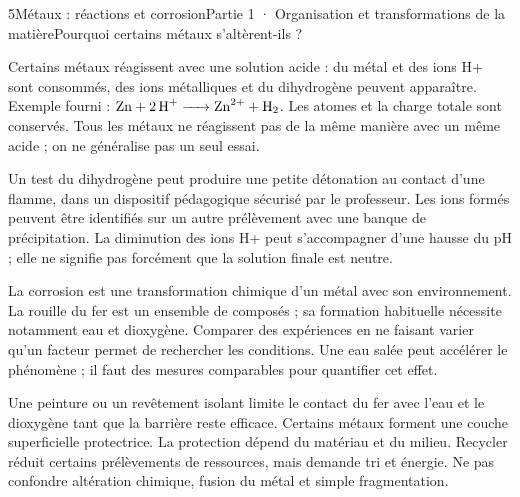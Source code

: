 \begin{ouverture}[college1]{5}{Métaux : réactions et corrosion}{Partie 1 · Organisation et transformations de la matière}{Pourquoi certains métaux s’altèrent-ils ?}
\end{ouverture}
\label{ess-5}
Certains métaux réagissent avec une solution acide : du métal et des ions H+ sont consommés, des ions métalliques et du dihydrogène peuvent apparaître. Exemple fourni : $\ce{Zn + 2 H+ -> Zn^{2+} + H2}$. Les atomes et la charge totale sont conservés. Tous les métaux ne réagissent pas de la même manière avec un même acide ; on ne généralise pas un seul essai.\par
{}
Un test du dihydrogène peut produire une petite détonation au contact d’une flamme, dans un dispositif pédagogique sécurisé par le professeur. Les ions formés peuvent être identifiés sur un autre prélèvement avec une banque de précipitation. La diminution des ions H+ peut s’accompagner d’une hausse du pH ; elle ne signifie pas forcément que la solution finale est neutre.\par
\clearpage
{}
La corrosion est une transformation chimique d’un métal avec son environnement. La rouille du fer est un ensemble de composés ; sa formation habituelle nécessite notamment eau et dioxygène. Comparer des expériences en ne faisant varier qu’un facteur permet de rechercher les conditions. Une eau salée peut accélérer le phénomène ; il faut des mesures comparables pour quantifier cet effet.\par
{}
Une peinture ou un revêtement isolant limite le contact du fer avec l’eau et le dioxygène tant que la barrière reste efficace. Certains métaux forment une couche superficielle protectrice. La protection dépend du matériau et du milieu. Recycler réduit certains prélèvements de ressources, mais demande tri et énergie. Ne pas confondre altération chimique, fusion du métal et simple fragmentation.\par
